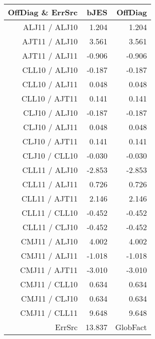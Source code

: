 \begin{table}[H]
\scriptsize
\begin{center}
\renewcommand{\arraystretch}{1.1}
\begin{tabular}{|r|r|r|}
\hline
 OffDiag \& ErrSrc & {\tiny bJES} & OffDiag\\
\hline
ALJ11 / ALJ10 &  \colorbox{Tomato1}{    1.204} &  \colorbox{Tomato1}{    1.204} \\
AJT11 / ALJ10 &  \colorbox{Tomato1}{    3.561} &  \colorbox{Tomato1}{    3.561} \\
AJT11 / ALJ11 &     -0.906 &     -0.906 \\
CLL10 / ALJ10 &     -0.187 &     -0.187 \\
CLL10 / ALJ11 &      0.048 &      0.048 \\
CLL10 / AJT11 &  \colorbox{Orange1}{    0.141} &  \colorbox{Orange1}{    0.141} \\
CLJ10 / ALJ10 &     -0.187 &     -0.187 \\
CLJ10 / ALJ11 &      0.048 &      0.048 \\
CLJ10 / AJT11 &  \colorbox{Orange1}{    0.141} &  \colorbox{Orange1}{    0.141} \\
CLJ10 / CLL10 &     -0.030 &     -0.030 \\
CLL11 / ALJ10 &     -2.853 &     -2.853 \\
CLL11 / ALJ11 &  \colorbox{Tomato1}{    0.726} &  \colorbox{Tomato1}{    0.726} \\
CLL11 / AJT11 &  \colorbox{Tomato1}{    2.146} &  \colorbox{Tomato1}{    2.146} \\
CLL11 / CLL10 &     -0.452 &     -0.452 \\
CLL11 / CLJ10 &     -0.452 &     -0.452 \\
CMJ11 / ALJ10 &  \colorbox{Tomato1}{    4.002} &  \colorbox{Tomato1}{    4.002} \\
CMJ11 / ALJ11 &     -1.018 &     -1.018 \\
CMJ11 / AJT11 &     -3.010 &     -3.010 \\
CMJ11 / CLL10 &  \colorbox{Tomato1}{    0.634} &  \colorbox{Tomato1}{    0.634} \\
CMJ11 / CLJ10 &  \colorbox{Tomato1}{    0.634} &  \colorbox{Tomato1}{    0.634} \\
CMJ11 / CLL11 &  \colorbox{Tomato1}{    9.648} &  \colorbox{Tomato1}{    9.648} \\
\hline
\multirow{2}{*}{ErrSrc} & \multirow{2}{*}{ \colorbox{Tomato1}{   13.837}} & GlobFact\\

\end{tabular}
\end{center}
\end{table}
